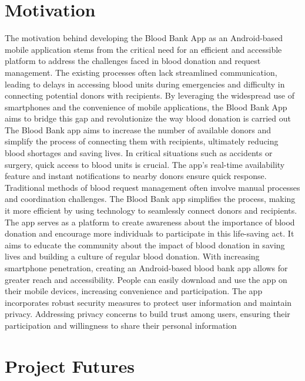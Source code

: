 \documentclass{article}
\begin{document}
\section{Motivation}
The motivation behind developing the Blood Bank App as an Android-based mobile application
stems from the critical need for an efficient and accessible platform to address the challenges
faced in blood donation and request management. The existing processes often lack streamlined
communication, leading to delays in accessing blood units during emergencies and difficulty in
connecting potential donors with recipients. By leveraging the widespread use of smartphones
and the convenience of mobile applications, the Blood Bank App aims to bridge this gap and
revolutionize the way blood donation is carried out The Blood Bank app aims to increase the
number of available donors and simplify the process of connecting them with recipients,
ultimately reducing blood shortages and saving lives. In critical situations such as accidents or
surgery, quick access to blood units is crucial. The app's real-time availability feature and instant
notifications to nearby donors ensure quick response. Traditional methods of blood request
management often involve manual processes and coordination challenges. The Blood Bank app
simplifies the process, making it more efficient by using technology to seamlessly connect donors
and recipients. The app serves as a platform to create awareness about the importance of blood
donation and encourage more individuals to participate in this life-saving act. It aims to educate
the community about the impact of blood donation in saving lives and building a culture of
regular blood donation. With increasing smartphone penetration, creating an Android-based
blood bank app allows for greater reach and accessibility. People can easily download and use
the app on their mobile devices, increasing convenience and participation. The app incorporates
robust security measures to protect user information and maintain privacy. Addressing privacy
concerns to build trust among users, ensuring their participation and willingness to share their
personal information
\section{Project Futures}
\end{document}
